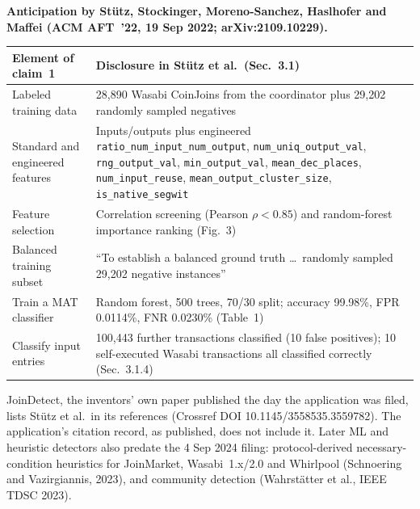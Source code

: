 \documentclass[10pt,a4paper]{article}
\begin{document}
\noindent\textbf{Anticipation by St\"utz, Stockinger, Moreno-Sanchez, Haslhofer and Maffei (ACM AFT~'22, 19 Sep 2022; arXiv:2109.10229).}
\begin{center}\small
\begin{tabularx}{\textwidth}{>{\raggedright\arraybackslash}p{4.4cm}X}
\toprule
Element of claim~1 & Disclosure in St\"utz et al.\ (Sec.~3.1) \\
\midrule
Labeled training data & 28,890 Wasabi CoinJoins from the coordinator plus 29,202 randomly sampled negatives \\
Standard and engineered features & Inputs/outputs plus engineered \texttt{ratio\_num\_input\_num\_output}, \texttt{num\_uniq\_output\_val}, \texttt{rng\_output\_val}, \texttt{min\_output\_val}, \texttt{mean\_dec\_places}, \texttt{num\_input\_reuse}, \texttt{mean\_output\_cluster\_size}, \texttt{is\_native\_segwit} \\
Feature selection & Correlation screening (Pearson $\rho<0.85$) and random-forest importance ranking (Fig.~3) \\
Balanced training subset & ``To establish a balanced ground truth \ldots\ randomly sampled 29,202 negative instances'' \\
Train a MAT classifier & Random forest, 500 trees, 70/30 split; accuracy 99.98\%, FPR 0.0114\%, FNR 0.0230\% (Table~1) \\
Classify input entries & 100,443 further transactions classified (10 false positives); 10 self-executed Wasabi transactions all classified correctly (Sec.~3.1.4) \\
\bottomrule
\end{tabularx}
\end{center}
JoinDetect, the inventors' own paper published the day the application was filed, lists St\"utz et al.\ in its references (Crossref DOI 10.1145/3558535.3559782). The application's citation record, as published, does not include it. Later ML and heuristic detectors also predate the 4 Sep 2024 filing: protocol-derived necessary-condition heuristics for JoinMarket, Wasabi~1.x/2.0 and Whirlpool (Schnoering and Vazirgiannis, 2023), and community detection (Wahrst\"atter et al., IEEE TDSC 2023).
\end{document}
